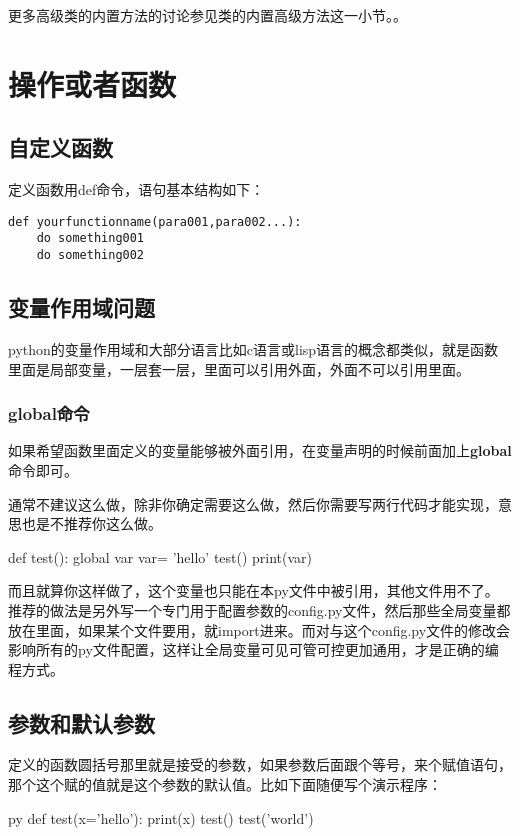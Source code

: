 \documentclass[12pt,oneside]{book}
\begin{document}
\begin{common-format}
更多高级类的内置方法的讨论参见类的内置高级方法这一小节。。


\chapter{操作或者函数}
\section{自定义函数}
定义函数用def命令，语句基本结构如下：
\begin{Verbatim}
def yourfunctionname(para001,para002...):
    do something001
    do something002
\end{Verbatim}

\section{变量作用域问题}
python的变量作用域和大部分语言比如c语言或lisp语言的概念都类似，就是函数里面是局部变量，一层套一层，里面可以引用外面，外面不可以引用里面。

\subsection{global命令}
如果希望函数里面定义的变量能够被外面引用，在变量声明的时候前面加上\textbf{global}命令即可。

通常不建议这么做，除非你确定需要这么做，然后你需要写两行代码才能实现，意思也是不推荐你这么做。
\begin{tcbpython}
def test():
    global var
    var= 'hello'
test()
print(var)
\end{tcbpython}

而且就算你这样做了，这个变量也只能在本py文件中被引用，其他文件用不了。推荐的做法是另外写一个专门用于配置参数的config.py文件，然后那些全局变量都放在里面，如果某个文件要用，就import进来。而对与这个config.py文件的修改会影响所有的py文件配置，这样让全局变量可见可管可控更加通用，才是正确的编程方式。


\section{参数和默认参数}
定义的函数圆括号那里就是接受的参数，如果参数后面跟个等号，来个赋值语句，那个这个赋的值就是这个参数的默认值。比如下面随便写个演示程序：
\begin{xverbatim}[129]{py}
def test(x='hello'):
    print(x)
test()
test('world')
\end{xverbatim}



\end{common-format}
\end{document}
